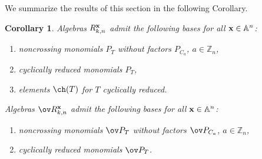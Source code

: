 \documentclass[11pt]{amsart}
\numberwithin{equation}{section}
\newtheorem{cor}[thm]{Corollary}
\newcommand{\bZ}{{\mathbb Z}}
\newcommand{\bA}{{\mathbb A}}
\newcommand{\bfx}{{\bf x}}
\begin{document}
We summarize the results of this section in the following Corollary.

\begin{cor} \label{cor:5 bases cylic case}
Algebras $R^\bfx_{k,n}$ admit the following bases for all $\bfx\in\bA^n$:
\begin{enumerate}
\item noncrossing monomials $P_T$ without factors $P_{C_a}$, $a\in\bZ_n$,
\item cyclically reduced monomials $P_T$,
\item elements $\ch(T)$ for $T$ cyclically reduced.
\end{enumerate}    
Algebras $\ov R^\bfx_{k,n}$ admit the following bases for all $\bfx\in\bA^n$:
\begin{enumerate}
\item noncrossing monomials $\ov P_T$ without factors $\ov P_{C_a}$, $a\in\bZ_n$,
\item cyclically reduced monomials $\ov P_T$.
\end{enumerate}    
\end{cor}
\end{document}
